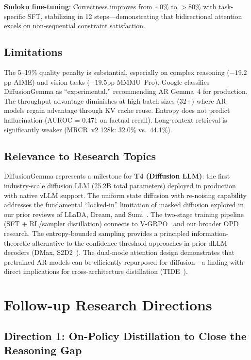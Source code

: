 \documentclass[11pt,a4paper]{article}
\begin{document}
\textbf{Sudoku fine-tuning}: Correctness improves from $\sim$0\% to $>$80\% with task-specific SFT, stabilizing in 12 steps---demonstrating that bidirectional attention excels on non-sequential constraint satisfaction.

\subsection{Limitations}
The 5--19\% quality penalty is substantial, especially on complex reasoning ($-19.2$pp AIME) and vision tasks ($-19.5$pp MMMU~Pro). Google classifies DiffusionGemma as ``experimental,'' recommending AR Gemma~4 for production. The throughput advantage diminishes at high batch sizes (32+) where AR models regain advantage through KV cache reuse. Entropy does not predict hallucination (AUROC = 0.471 on factual recall). Long-context retrieval is significantly weaker (MRCR~v2 128k: 32.0\% vs.\ 44.1\%).

\subsection{Relevance to Research Topics}
DiffusionGemma represents a milestone for \textbf{T4 (Diffusion LLM)}: the first industry-scale diffusion LLM (25.2B total parameters) deployed in production with native vLLM support. The uniform state diffusion with re-noising capability addresses the fundamental ``locked-in'' limitation of masked diffusion explored in our prior reviews of LLaDA, Dream, and Sumi~\cite{sumi2026}. The two-stage training pipeline (SFT + RL/sampler distillation) connects to V-GRPO~\cite{vgrpo2026} and our broader OPD research. The entropy-bounded sampling provides a principled information-theoretic alternative to the confidence-threshold approaches in prior dLLM decoders (DMax, S2D2~\cite{s2d2}). The dual-mode attention design demonstrates that pretrained AR models can be efficiently repurposed for diffusion---a finding with direct implications for cross-architecture distillation (TIDE~\cite{tide2026}).

\section{Follow-up Research Directions}

\subsection{Direction 1: On-Policy Distillation to Close the Reasoning Gap}
\end{document}
